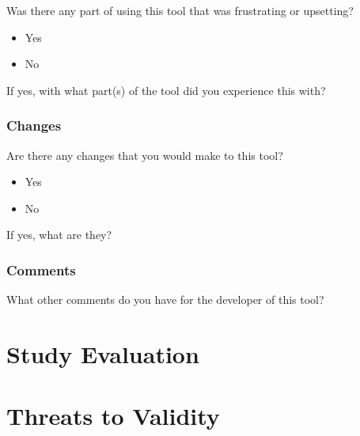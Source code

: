 Was there any part of using this tool that was frustrating or upsetting?

\begin{itemize}
	\item Yes
	\item No
\end{itemize}

\noindent If yes, with what part(s) of the tool did you experience this with?

\subsubsection{Changes}
\label{subsubsec:Changes}

Are there any changes that you would make to this tool?

\begin{itemize}
	\item Yes
	\item No
\end{itemize}

\noindent If yes, what are they?

\subsubsection{Comments}
\label{subsubsec:Comments}

What other comments do you have for the developer of this tool?

\section{Study Evaluation}
\label{sec:studyevaluation}



\section{Threats to Validity}
\label{sec:threatstovalidity}

